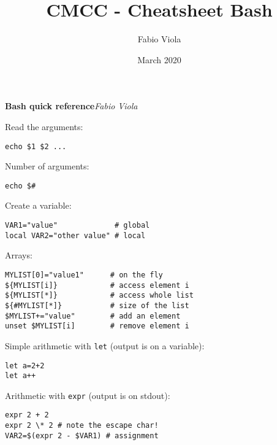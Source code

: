 \documentclass[twocolumn,8pt]{article}
\title{CMCC - Cheatsheet Bash}
\author{Fabio Viola}
\date{March 2020}
\begin{document}

\LARGE \textbf{Bash quick reference}\hfill \textit{\small Fabio Viola}\normalsize 


\begin{mdframed}[frametitle=Command-line arguments]
Read the arguments:
\begin{lstlisting}
echo $1 $2 ...
\end{lstlisting}

Number of arguments:
\begin{lstlisting}
echo $#
\end{lstlisting}
\end{mdframed}


\begin{mdframed}[frametitle=Variables]
Create a variable:
\begin{lstlisting}
VAR1="value"             # global
local VAR2="other value" # local
\end{lstlisting}
Arrays:
\begin{lstlisting}
MYLIST[0]="value1"      # on the fly
${MYLIST[i]}            # access element i
${MYLIST[*]}            # access whole list
${#MYLIST[*]}           # size of the list
$MYLIST+="value"        # add an element
unset $MYLIST[i]        # remove element i
\end{lstlisting}
\end{mdframed}


\begin{mdframed}[frametitle=Arithmetic]
Simple arithmetic with \texttt{let} (output is on a variable):
\begin{lstlisting}
let a=2+2
let a++
\end{lstlisting}

Arithmetic with \texttt{expr} (output is on stdout):
\begin{lstlisting}
expr 2 + 2
expr 2 \* 2 # note the escape char!
VAR2=$(expr 2 - $VAR1) # assignment
\end{lstlisting}
\end{mdframed}
\end{document}
